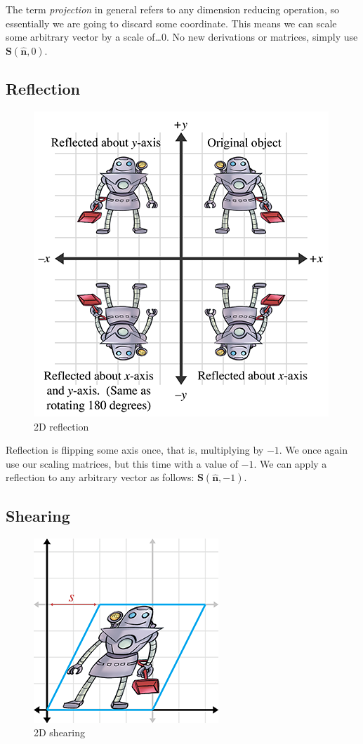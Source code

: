 \documentclass[a4paper,11pt]{article}
\begin{document}
The term \textit{projection} in general refers to any dimension reducing operation, so essentially we are going to discard some coordinate. This means we can scale some arbitrary vector by a scale of\dots $0$. No new derivations or matrices, simply use $\mathbf{S}(\hat{\mathbf{n}},0)$.

\subsection{Reflection}

\begin{figure}[H]
\centering
    \includegraphics{05_reflection}
\caption{2D reflection}
\label{fig:2d-reflection}
\end{figure}

Reflection is flipping some axis once, that is, multiplying by $-1$. We once again use our scaling matrices, but this time with a value of $-1$. We can apply a reflection to any arbitrary vector as follows: $\mathbf{S}(\hat{\mathbf{n}},-1)$.

\subsection{Shearing}

\begin{figure}[H]
\centering
    \includegraphics{05_shearing}
\caption{2D shearing}
\label{fig:2d-shearing}
\end{figure}
\end{document}

